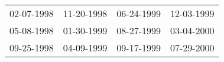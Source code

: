 \begin{supertabular}{llll}
 02-07-1998 &  11-20-1998 &  06-24-1999 &  12-03-1999 \\
 05-08-1998 &  01-30-1999 &  08-27-1999 &  03-04-2000 \\
 09-25-1998 &  04-09-1999 &  09-17-1999 &  07-29-2000 \\
\end{supertabular}
